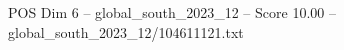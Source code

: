 \begin{textsample}{POS Dim 6 – global\_south\_2023\_12 – Score 10.00 – global\_south\_2023\_12/104611121.txt}
\end{textsample}
